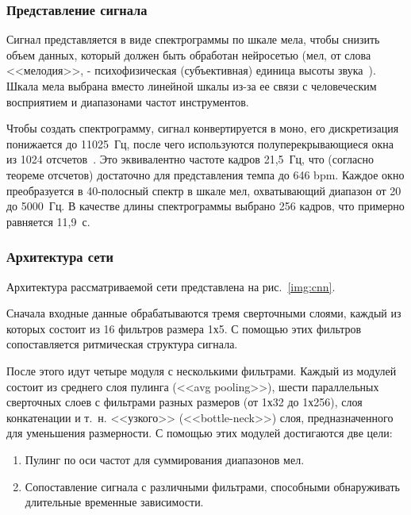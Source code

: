\subsubsection{Представление сигнала}

Сигнал представляется в виде спектрограммы по шкале мела, чтобы снизить объем данных, который должен быть обработан нейросетью (мел, от слова <<мелодия>>, - психофизическая (субъективная) единица высоты звука~\cite{mels}). Шкала мела выбрана вместо линейной шкалы из-за ее связи с человеческим восприятием и диапазонами частот инструментов.

Чтобы создать спектрограмму, сигнал конвертируется в моно, его дискретизация понижается до 11025~Гц, после чего используются полуперекрывающиеся окна из 1024 отсчетов~\cite{cnn}. Это эквивалентно частоте кадров 21,5~Гц, что (согласно теореме отсчетов) достаточно для представления темпа до 646 bpm. Каждое окно преобразуется в 40-полосный спектр в шкале мел, охватывающий диапазон от 20 до 5000~Гц. В качестве длины спектрограммы выбрано 256 кадров, что примерно равняется 11,9~с.

\subsubsection{Архитектура сети}

Архитектура рассматриваемой сети представлена на рис.~\ref{img:cnn}.

Сначала входные данные обрабатываются тремя сверточными слоями, каждый из которых состоит из 16 фильтров размера 1х5. С помощью этих фильтров сопоставляется ритмическая структура сигнала.

После этого идут четыре модуля с несколькими фильтрами. Каждый из модулей состоит из среднего слоя пулинга (<<avg pooling>>), шести параллельных сверточных слоев с фильтрами разных размеров (от 1х32 до 1х256), слоя конкатенации и т.~н. <<узкого>> (<<bottle-neck>>) слоя, предназначенного для уменьшения размерности. С помощью этих модулей достигаются две цели:

\begin{enumerate} 
	\item Пулинг по оси частот для суммирования диапазонов мел.
	\item Сопоставление сигнала с различными фильтрами, способными обнаруживать длительные временные зависимости.
\end{enumerate}

